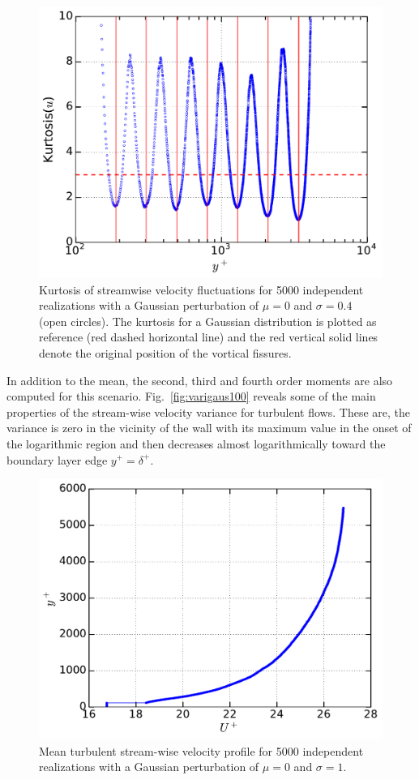 \documentclass[aps,reprint,amsmath,amssymb,pra]{revtex4-1}%
\begin{document}
\begin{figure}[tb]
\includegraphics[scale=0.46]{figures/kurtosis_5000_assembles}
\caption{\label{fig:kurt} Kurtosis of streamwise velocity fluctuations for 5000 independent realizations with a Gaussian perturbation of $\mu=0$ and $\sigma=0.4$ (open circles). The kurtosis for a Gaussian distribution is plotted as reference (red dashed horizontal line) and the red vertical solid lines denote the original position of the vortical fissures.}
\end{figure}
In addition to the mean, the second, third and fourth order moments are also computed for this scenario. Fig.~\ref{fig:varigaus100} reveals some of the main properties of the stream-wise velocity variance for turbulent flows.  These are, the variance is zero in the vicinity of the wall with its maximum value in the onset of the logarithmic region and then decreases almost logarithmically toward the boundary layer edge $y^+=\delta^+$. 
\begin{figure}[tb]
\includegraphics[scale=0.45]{figures/Master_averaged_step_profile_5000_assembles_gauss100}
\caption{\label{fig:mp_gau100} Mean turbulent stream-wise velocity profile for 5000 independent realizations with a Gaussian perturbation of $\mu=0$ and $\sigma=1$.}
\end{figure}
\end{document}
